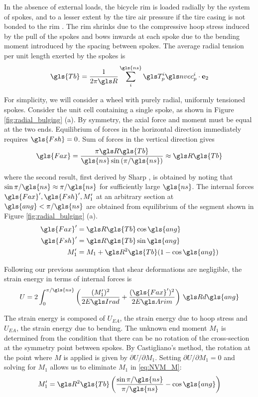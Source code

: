 \documentclass[\rootdir/thesis.tex]{subfiles}
\begin{document}
In the absence of external loads, the bicycle rim is loaded radially by the system of spokes, and to a lesser extent by the tire air pressure if the tire casing is not bonded to the rim \cite{Burgoyne1993}. The rim shrinks due to the compressive hoop stress induced by the pull of the spokes and bows inwards at each spoke due to the bending moment introduced by the spacing between spokes. The average radial tension per unit length exerted by the spokes is
\begin{equation}
\label{eq:Tbar}
\gls{Tb} = \frac{1}{2\pi \R} \sum_i^{\gls{ns}} \T_p^i \n_p^i \cdot\et
\end{equation}

For simplicity, we will consider a wheel with purely radial, uniformly tensioned spokes. Consider the unit cell containing a single spoke, as shown in Figure \ref{fig:radial_bulging} (a). By symmetry, the axial force and moment must be equal at the two ends. Equilibrium of forces in the horizontal direction immediately requires $\gls{Fsh}=0$. Sum of forces in the vertical direction gives
\begin{equation}
\label{eq:Nr}
\gls{Fax} = \frac{\pi \R\gls{Tb}}{\gls{ns}\sin{(\pi/\gls{ns})}} \approx \R\gls{Tb}
\end{equation}

where the second result, first derived by Sharp \cite{Sharp1977}, is obtained by noting that $\sin{\pi/\gls{ns}}\approx \pi/\gls{ns}$ for sufficiently large $\gls{ns}$. The internal forces $\gls{Fax}',\gls{Fsh}',M_1'$ at an arbitrary section at $\gls{ang} < \pi/\gls{ns}$ are obtained from equilibrium of the segment shown in Figure \ref{fig:radial_bulging} (a).
\begin{subequations}
\begin{align}
\gls{Fax}' &= \R\gls{Tb}\cos{\gls{ang}}\\
\gls{Fsh}' &= \R\gls{Tb}\sin{\gls{ang}}\\
M_1'       &= M_1 + \R^2\gls{Tb}(1-\cos{\gls{ang}})\label{eq:NVM_M}
\end{align}
\end{subequations}

Following our previous assumption that shear deformations are negligible, the strain energy in terms of internal forces is
\begin{equation}
U = 2\int_0^{\pi/\gls{ns}} \left(\frac{(M_1')^2}{2\EIr} + \frac{(\gls{Fax}')^2}{2\EA}\right)\, \R d\gls{ang}
\end{equation}

The strain energy is composed of $U_{EA}$, the strain energy due to hoop stress and $U_{EA}$, the strain energy due to bending. The unknown end moment $M_1$ is determined from the condition that there can be no rotation of the cross-section at the symmetry point between spokes. By Castigliano's method, the rotation at the point where $M$ is applied is given by $\partial U/\partial M_1$. Setting $\partial U/\partial M_1=0$ and solving for $M_1$ allows us to eliminate $M_1$ in \eqref{eq:NVM_M}:
\begin{equation}
M_1' = \R^2\gls{Tb} \left( \frac{\sin{\pi/\gls{ns}}}{\pi/\gls{ns}} - \cos{\gls{ang}} \right)
\end{equation}
\end{document}
